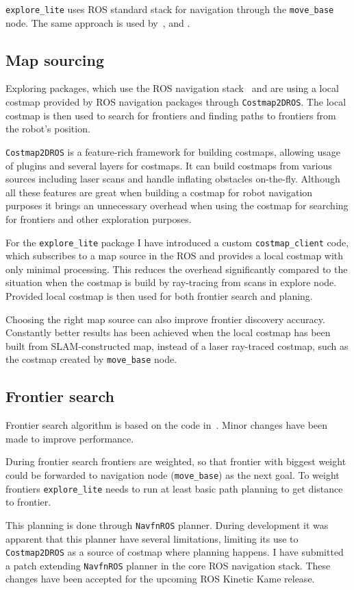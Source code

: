 \texttt{explore\_lite} uses \gls{ROS} standard stack for navigation through the \texttt{move\_base} node. The same approach is used by~\cite{DuHadway2010}, \cite{Bovbel2010} and \cite{Andre2014}.

\subsection{Map sourcing}
\label{sec:map-sourcing}

Exploring packages, which use the \gls{ROS} navigation stack~\cite{Bovbel2010} and \cite{DuHadway2010} are using a local costmap provided by \gls{ROS} navigation packages through \texttt{Cost\-map\-2D\-ROS}. The local costmap is then used to search for frontiers and finding paths to frontiers from the robot's position.

\texttt{Costmap2DROS} is a feature-rich framework for building costmaps, allowing usage of plugins and several layers for costmaps. It can build costmaps from various sources including laser scans and handle inflating obstacles on-the-fly. Although all these features are great when building a costmap for robot navigation purposes it brings an unnecessary overhead when using the costmap for searching for frontiers and other exploration purposes.

For the \texttt{explore\_lite} package I have introduced a custom \texttt{costmap\_client} code, which subscribes to a map source in the \gls{ROS} and provides a local costmap with only minimal processing. This reduces the overhead significantly compared to the situation when the costmap is build by ray-tracing from scans in explore node. Provided local costmap is then used for both frontier search and planing.

Choosing the right map source can also improve frontier discovery accuracy. Constantly better results has been achieved when the local costmap has been built from \gls{SLAM}-constructed map, instead of a laser ray-traced costmap, such as the costmap created by \texttt{move\_base} node.

\subsection{Frontier search}
\label{sec:frontier-search}

Frontier search algorithm is based on the code in~\cite{DuHadway2010}. Minor changes have been made to improve performance.

During frontier search frontiers are weighted, so that frontier with biggest weight could be forwarded to navigation node (\texttt{move\_base}) as the next goal. To weight frontiers \texttt{explore\_lite} needs to run at least basic path planning to get distance to frontier.

This planning is done through \texttt{NavfnROS} planner. During development it was apparent that this planner have several limitations, limiting its use to \texttt{Cost\-map\-2D\-ROS} as a source of costmap where planning happens. I have submitted a patch extending \texttt{NavfnROS} planner in the core \gls{ROS} navigation stack. These changes have been accepted for the upcoming \gls{ROS} Kinetic Kame release.


